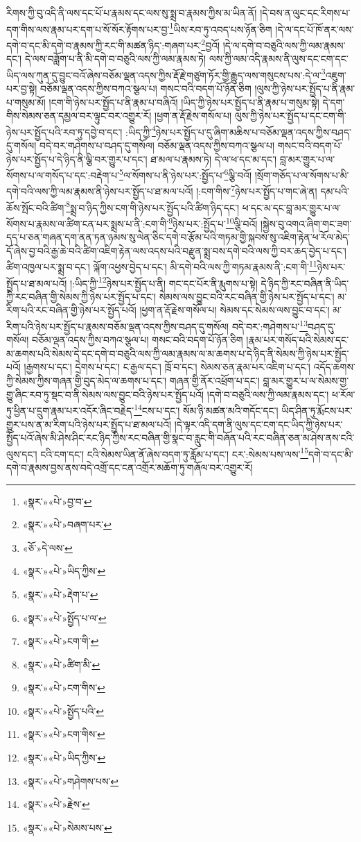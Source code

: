 རིགས་ཀྱི་བུ་འདི་ནི་ལས་དང་པོ་པ་རྣམས་དང་ལས་སུ་སྨྲ་བ་རྣམས་ཀྱིས་མ་ཡིན་ནོ། །དེ་བས་ན་ལུང་དང་རིགས་པ་དག་གིས་ལས་རྣམ་པར་དག་པ་སོ་སོར་རྟོགས་པར་བྱ་\footnote{«སྣར་»«པེ་»བྱ་བ་}ཡིས་རབ་ཏུ་འབད་པས་ཉོན་ཅིག །དེ་ལ་དང་པོ་ཁོ་ནར་ལས་དགེ་བ་དང་མི་དགེ་བ་རྣམས་ཀྱི་རང་གི་མཚན་ཉིད་:གཞག་པར་\footnote{«སྣར་»«པེ་»བཞག་པར་}བྱའོ། །དེ་ལ་དགེ་བ་བཅུའི་ལས་ཀྱི་ལམ་རྣམས་དང་། དེ་ལས་བཟློག་པ་ནི་མི་དགེ་བ་བཅུའི་ལས་ཀྱི་ལམ་རྣམས་ཏེ། ལས་ཀྱི་ལམ་འདི་རྣམས་ནི་ལུས་དང་ངག་དང་ཡིད་ལས་ཀུན་དུ་བྱུང་བའོ་ཞེས་བཅོམ་ལྡན་འདས་ཀྱིས་རྡོ་རྗེ་གཙུག་ཏོར་གྱི་རྒྱུད་ལས་གསུངས་པས་:དེ་ལ་\footnote{«ཅོ་»དེ་ལས་}འཇུག་པར་བྱ་སྟེ། བཅོམ་ལྡན་འདས་ཀྱིས་བཀའ་སྩལ་པ། གསང་བའི་བདག་པོ་ཉོན་ཅིག །ལུས་ཀྱི་ཉེས་པར་སྤྱོད་པ་ནི་རྣམ་པ་གསུམ་མོ། །ངག་གི་ཉེས་པར་སྤྱོད་པ་ནི་རྣམ་པ་བཞིའོ། །ཡིད་ཀྱི་ཉེས་པར་སྤྱོད་པ་ནི་རྣམ་པ་གསུམ་སྟེ། དེ་དག་གིས་སེམས་ཅན་དམྱལ་བར་ལྟུང་བར་འགྱུར་རོ། །ཕྱག་ན་རྡོ་རྗེས་གསོལ་པ། ལུས་ཀྱི་ཉེས་པར་སྤྱོད་པ་དང་ངག་གི་ཉེས་པར་སྤྱོད་པའི་རབ་ཏུ་དབྱེ་བ་དང་། :ཡིད་ཀྱི་\footnote{«སྣར་»«པེ་»ཡིད་ཀྱིས་}ཉེས་པར་སྤྱོད་པ་དུ་ཞིག་མཆིས་པ་བཅོམ་ལྡན་འདས་ཀྱིས་བཤད་དུ་གསོལ། བདེ་བར་གཤེགས་པ་བཤད་དུ་གསོལ། བཅོམ་ལྡན་འདས་ཀྱིས་བཀའ་སྩལ་པ། གསང་བའི་བདག་པོ་ཉེས་པར་སྤྱོད་པ་དེ་ཉིད་ནི་ལྕི་བར་གྱུར་པ་དང་། ཐ་མལ་པ་རྣམས་ཏེ། དེ་ལ་ཕ་དང་མ་དང་། བླ་མར་གྱུར་པ་ལ་སོགས་པ་ལ་གསོད་པ་དང་:བརྡེག་པ་\footnote{«སྣར་»«པེ་»རྡེག་པ་}ལ་སོགས་པ་ནི་ཉེས་པར་:སྤྱོད་པ་\footnote{«སྣར་»«པེ་»སྤྱོད་པ་ལ་}ལྕི་བའོ། །སྲོག་གཅོད་པ་ལ་སོགས་པ་མི་དགེ་བའི་ལས་ཀྱི་ལམ་རྣམས་ནི་ཉེས་པར་སྤྱོད་པ་ཐ་མལ་པའོ། །:ངག་གིས་\footnote{«སྣར་»«པེ་»ངག་གི་}ཉེས་པར་སྤྱོད་པ་གང་ཞེ་ན། དམ་པའི་ཆོས་སྤོང་བའི་ཚིག་\footnote{«སྣར་»«པེ་»ཚིག་མི་}སྨྲ་བ་ཉིད་ཀྱིས་ངག་གི་ཉེས་པར་སྤྱོད་པའི་ཚིག་ཉིད་དང་། ཕ་དང་མ་དང་བླ་མར་གྱུར་པ་ལ་སོགས་པ་རྣམས་ལ་ཚིག་ངན་པར་སྨྲས་པ་ནི་:ངག་གི་\footnote{«སྣར་»«པེ་»ངག་གིས་}ཉེས་པར་:སྤྱོད་པ་\footnote{«སྣར་»«པེ་»སྤྱོད་པའི་}ལྕི་བའོ། །སྐྱེས་བུ་འགའ་ཞིག་གང་ཟག་དད་པ་ཅན་གཞན་དག་ནན་ཏན་ཉམས་སུ་ལེན་ཅིང་དགེ་བ་རྩོམ་པའི་གཏམ་གྱི་སྐབས་སུ་འཇིག་རྟེན་ཕ་རོལ་མེད་དོ་ཞེས་བྱ་བའི་རྒྱ་ཆེ་བའི་ཚིག་འཇིག་རྟེན་ལས་འདས་པའི་བརྫུན་སྨྲ་བས་དགེ་བའི་ལས་ཀྱི་བར་ཆད་བྱེད་པ་དང་། ཚིག་འཁྱལ་པར་སྨྲ་བ་དང་། ལྐོག་འཕྱས་བྱེད་པ་དང་། མི་དགེ་བའི་ལས་ཀྱི་གཏམ་རྣམས་ནི་:ངག་གི་\footnote{«སྣར་»«པེ་»ངག་གིས་}ཉེས་པར་སྤྱོད་པ་ཐ་མལ་པའོ། །:ཡིད་ཀྱི་\footnote{«སྣར་»«པེ་»ཡིད་ཀྱིས་}ཉེས་པར་སྤྱོད་པ་ནི། གང་དང་པོར་ནི་རྨུགས་པ་སྟེ། དེ་ཉིད་ཀྱི་རང་བཞིན་ནི་ཡིད་ཀྱི་རང་བཞིན་གྱི་སེམས་ཀྱི་ཉེས་པར་སྤྱོད་པ་དང་། སེམས་ལས་བྱུང་བའི་རང་བཞིན་གྱི་ཉེས་པར་སྤྱོད་པ་དང་། མ་རིག་པའི་རང་བཞིན་གྱི་ཉེས་པར་སྤྱོད་པའོ། །ཕྱག་ན་རྡོ་རྗེས་གསོལ་པ། སེམས་དང་སེམས་ལས་བྱུང་བ་དང་། མ་རིག་པའི་ཉེས་པར་སྤྱོད་པ་རྣམས་བཅོམ་ལྡན་འདས་ཀྱིས་བཤད་དུ་གསོལ། བདེ་བར་:གཤེགས་པ་\footnote{«སྣར་»«པེ་»གཤེགས་པས་}བཤད་དུ་གསོལ། བཅོམ་ལྡན་འདས་ཀྱིས་བཀའ་སྩལ་པ། གསང་བའི་བདག་པོ་ཉོན་ཅིག །རྣམ་པར་གསོད་པའི་སེམས་དང་མ་ཆགས་པའི་སེམས་དེ་དང་དགེ་བ་བཅུའི་ལས་ཀྱི་ལམ་རྣམས་ལ་མ་ཆགས་པ་དེ་ཉིད་ནི་སེམས་ཀྱི་ཉེས་པར་སྤྱོད་པའོ། །རྒྱགས་པ་དང་། དྲེགས་པ་དང་། ང་རྒྱལ་དང་། ཁྲོ་བ་དང་། སེམས་ཅན་རྣམ་པར་འཇིག་པ་དང་། འདོད་ཆགས་ཀྱི་སེམས་ཀྱིས་གཞན་གྱི་བུད་མེད་ལ་ཆགས་པ་དང་། གཞན་གྱི་ནོར་འཕྲོག་པ་དང་། བླ་མར་གྱུར་པ་ལ་སེམས་གྱ་གྱུ་ཞིང་རབ་ཏུ་སྡང་བ་ནི་སེམས་ལས་བྱུང་བའི་ཉེས་པར་སྤྱོད་པའོ། །དགེ་བ་བཅུའི་ལས་ཀྱི་ལམ་རྣམས་དང་། ཕ་རོལ་ཏུ་ཕྱིན་པ་དྲུག་རྣམ་པར་འདོར་ཞིང་བརྗེད་\footnote{«སྣར་»«པེ་»རྗེས་}ངས་པ་དང་། སོམ་ཉི་མཚན་མའི་གདོང་དང་། ཡིད་ཤིན་ཏུ་རྨོངས་པར་གྱུར་པས་ན་མ་རིག་པའི་ཉེས་པར་སྤྱོད་པ་ཐ་མལ་པའོ། །དེ་ལྟར་འདི་དག་ནི་ལུས་དང་ངག་དང་ཡིད་ཀྱི་ཉེས་པར་སྤྱོད་པའོ་ཞེས་མི་ཤེས་ཤིང་རང་ཉིད་ཀྱིས་རང་བཞིན་གྱི་སྣང་བ་རླུང་གི་བཞོན་པའི་རང་བཞིན་ཅན་མ་ཤེས་ནས་ངའི་ལུས་དང་། ངའི་ངག་དང་། ངའི་སེམས་ཡིན་ནོ་ཞེས་བདག་ཏུ་རློམ་པ་དང་། ངར་:སེམས་པས་ལས་\footnote{«སྣར་»«པེ་»སེམས་པས་}དགེ་བ་དང་མི་དགེ་བ་རྣམས་བྱས་ནས་བདེ་འགྲོ་དང་ངན་འགྲོར་མཆོག་ཏུ་གཞོལ་བར་འགྱུར་རོ། 